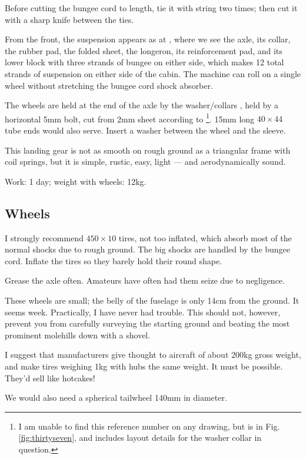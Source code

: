 \documentclass{book}
\newcommand*\circled[1]{\tikz[baseline=(char.base)]{
    \node[shape=circle,draw,inner sep=1pt] (char) {#1};}}
\begin{document}
Before cutting the bungee cord to length, tie it with string two
times; then cut it with a sharp knife between the ties.

From the front, the suspension appears as at \circled{160}, where we
see the axle, its collar, the rubber pad, the folded sheet, the
longeron, its reinforcement pad, and its lower block with three
strands of bungee on either side, which makes 12 total strands of
suspension on either side of the cabin.  The machine can roll on a
single wheel without stretching the bungee cord shock absorber.

The wheels are held at the end of the axle by the washer/collars
\circled{161}, held by a horizontal 5mm bolt, cut from 2mm sheet
according to \circled{162}\footnote{I am unable to find this reference
  number on any drawing, but \circled{161} is in
  Fig. \ref{fig:thirtyseven}, and includes layout details for the
  washer collar in question.}.  15mm long $40\times44$ tube ends would
also serve.  Insert a washer between the wheel and the sleeve.

This landing gear is not as smooth on rough ground as a triangular
frame with coil springs, but it is simple, rustic, easy, light --- and
aerodynamically sound.

Work: 1 day; weight with wheels: 12kg.

\subsection{Wheels}

I strongly recommend $450\times10$ tires, not too inflated, which
absorb most of the normal shocks due to rough ground.  The big shocks
are handled by the bungee cord.  Inflate the tires so they barely hold
their round shape.

Grease the axle often.  Amateurs have often had them seize due to
negligence.

These wheels are small; the belly of the fuselage is only 14cm from
the ground.  It seems week.  Practically, I have never had trouble.
This should not, however, prevent you from carefully surveying the
starting ground and beating the most prominent molehills down with a
shovel.

I suggest that manufacturers give thought to aircraft of about 200kg
gross weight, and make tires weighing 1kg with hubs the same weight.
It must be possible.  They'd sell like hotcakes!

We would also need a spherical tailwheel 140mm in diameter.
\end{document}
